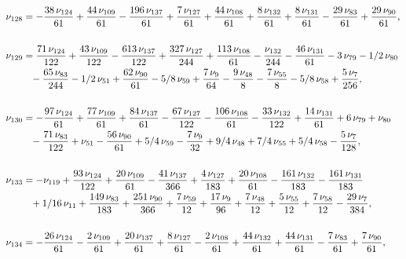 \documentclass[a4paper,12pt, DIV=14, BCOR=5mm, twoside, headsepline]{scrbook}
\begin{document}
\begin{align}\label{AreaSol12}
\begin{aligned}
\nu_{{128}}&=-{\frac {38\,\nu_{{124}}}{61}}+{\frac {44\,
\nu_{{109}}}{61}}-{\frac {196\,\nu_{{137}}}{61}}+{\frac {7\,\nu_{{127}
}}{61}}+{\frac {44\,\nu_{{108}}}{61}}+{\frac {8\,\nu_{{132}}}{61}}+{
\frac {8\,\nu_{{131}}}{61}}-{\frac {29\,\nu_{{83}}}{61}}+{\frac {29\,
\nu_{{90}}}{61}}, \\
\\
\nu_{{129}}&={\frac {71\,\nu_{{124}}}{122}}+{\frac {43
\,\nu_{{109}}}{122}}-{\frac {613\,\nu_{{137}}}{122}}+{\frac {327\,\nu_
{{127}}}{244}}+{\frac {113\,\nu_{{108}}}{61}}-{\frac {\nu_{{132}}}{244
}}-{\frac {46\,\nu_{{131}}}{61}}-3\,\nu_{{79}}-1/2\,\nu_{{80}}\\
 &\hphantom{=}-{\frac 
{65\,\nu_{{83}}}{244}}-1/2\,\nu_{{51}}+{\frac {62\,\nu_{{90}}}{61}}-5/
8\,\nu_{{59}}+{\frac {7\,\nu_{{9}}}{64}}-{\frac {9\,\nu_{{48}}}{8}}-{
\frac {7\,\nu_{{55}}}{8}}-5/8\,\nu_{{58}}+{\frac {5\,\nu_{{7}}}{256}},\\
\\
\nu_{{130}}&=-{\frac {97\,\nu_{{124}}}{61}}+{\frac {77\,\nu_{{109}}}{61
}}+{\frac {84\,\nu_{{137}}}{61}}-{\frac {67\,\nu_{{127}}}{122}}-{
\frac {106\,\nu_{{108}}}{61}}-{\frac {33\,\nu_{{132}}}{122}}+{\frac {
14\,\nu_{{131}}}{61}}+6\,\nu_{{79}}+\nu_{{80}}\\
 &\hphantom{=}-{\frac {71\,\nu_{{83}}
}{122}}+\nu_{{51}}-{\frac {56\,\nu_{{90}}}{61}}+5/4\,\nu_{{59}}-{
\frac {7\,\nu_{{9}}}{32}}+9/4\,\nu_{{48}}+7/4\,\nu_{{55}}+5/4\,\nu_{{
58}}-{\frac {5\,\nu_{{7}}}{128}}, \\
\\
\nu_{{133}}&=-\nu_{{119}}+{\frac {93\,
\nu_{{124}}}{122}}+{\frac {20\,\nu_{{109}}}{61}}-{\frac {41\,\nu_{{137
}}}{366}}+{\frac {4\,\nu_{{127}}}{183}}+{\frac {20\,\nu_{{108}}}{61}}-
{\frac {161\,\nu_{{132}}}{183}}-{\frac {161\,\nu_{{131}}}{183}}\\
 &\hphantom{=}+1/16\,
\nu_{{11}}+{\frac {149\,\nu_{{83}}}{183}}+{\frac {251\,\nu_{{90}}}{366
}}+{\frac {7\,\nu_{{59}}}{12}}+{\frac {17\,\nu_{{9}}}{96}}+{\frac {7\,
\nu_{{48}}}{12}}+{\frac {5\,\nu_{{55}}}{12}}+{\frac {7\,\nu_{{58}}}{12
}}-{\frac {29\,\nu_{{7}}}{384}}, \\
\\
\nu_{{134}}&=-{\frac {26\,\nu_{{124}}}{
61}}-{\frac {2\,\nu_{{109}}}{61}}+{\frac {20\,\nu_{{137}}}{61}}+{
\frac {8\,\nu_{{127}}}{61}}-{\frac {2\,\nu_{{108}}}{61}}+{\frac {44\,
\nu_{{132}}}{61}}+{\frac {44\,\nu_{{131}}}{61}}-{\frac {7\,\nu_{{83}}
}{61}}+{\frac {7\,\nu_{{90}}}{61}}, \\

\end{aligned}
\end{align}
\end{document}
